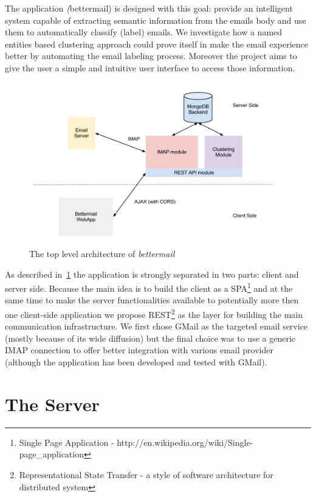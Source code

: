 \documentclass[a4paper,12pt]{report}
\begin{document}
The application \emph(bettermail) is designed with this goal: provide an intelligent system capable of extracting semantic information from the emails body and use them to automatically classify (label) emails. We investigate how a named entities based clustering approach could prove itself in make the email experience better by automating the email labeling process. Moreover the project aims to give the user a simple and intuitive user interface to access those information.
\begin{figure}[H]
  \centering
  \includegraphics[width=15cm]{Architecture_Overview}
  \caption{The top level architecture of \emph{bettermail}}
  \label{fig:arch}
\end{figure}

As described in~\ref{fig:arch} the application is strongly separated in two parts: client and server side. Because the main idea is to build the client as a SPA\footnote{Single Page Application - http://en.wikipedia.org/wiki/Single-page\_application} and at the same time to make the server functionalities available to potentially more then one client-side application we propose REST\footnote{Representational State Transfer - a style of software architecture for distributed system} as the layer for building the main communication infrastructure. 
We first chose GMail as the targeted email service (mostly because of its wide diffusion) but the final choice was to use a generic IMAP connection to offer better integration with various email provider (although the application has been developed and tested with GMail).
\chapter{The Server}
\end{document}
